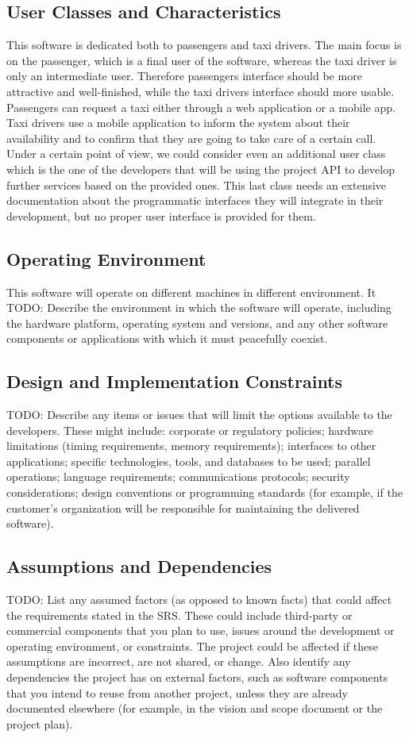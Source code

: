 \subsection{User Classes and Characteristics}
This software is dedicated both to passengers and taxi drivers. The main focus is on the passenger, which is a final user of the software, whereas the taxi driver is only an intermediate user. Therefore passengers interface should be more attractive and well-finished, while the taxi drivers interface should more usable.
Passengers can request a taxi either through a web application or a mobile app.
Taxi drivers use a mobile application to inform the system about their availability and to confirm that they are going to take care of a certain call.
Under a certain point of view, we could consider even an additional user class which is the one of the developers that will be using the project API to develop further services based on the provided ones.
This last class needs an extensive documentation about the programmatic interfaces they will integrate in their development, but no proper user interface is provided for them.
\subsection{Operating Environment}
This software will operate on different machines in different environment. It
TODO: Describe the environment in which the software will operate, including the hardware platform, operating system and versions, and any other software components or applications with which it must peacefully coexist.
\subsection{Design and Implementation Constraints}
TODO: Describe any items or issues that will limit the options available to the developers. These might include: corporate or regulatory policies; hardware limitations (timing requirements, memory requirements); interfaces to other applications; specific technologies, tools, and databases to be used; parallel operations; language requirements; communications protocols; security considerations; design conventions or programming standards (for example, if the customer’s organization will be responsible for maintaining the delivered software).
\subsection{Assumptions and Dependencies}
TODO: List any assumed factors (as opposed to known facts) that could affect the requirements stated in the SRS. These could include third-party or commercial components that you plan to use, issues around the development or operating environment, or constraints. The project could be affected if these assumptions are incorrect, are not shared, or change. Also identify any dependencies the project has on external factors, such as software components that you intend to reuse from another project, unless they are already documented elsewhere (for example, in the vision and scope document or the project plan).